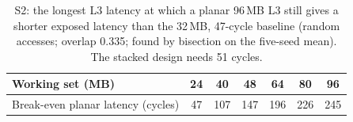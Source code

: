 \begin{table}[htbp]
  \centering
  \caption[S2: the slowest planar 96\,MB L3 that still beats the baseline]{S2: the longest L3 latency at which a planar 96\,MB L3 still gives a shorter exposed latency than the 32\,MB, 47-cycle baseline (random accesses; overlap 0.335; found by bisection on the five-seed mean). The stacked design needs 51 cycles.}
  \label{tab:sim-planar}
  \small
  \begin{tabular}{@{}lcccccc@{}}
    \toprule
    \textbf{Working set (MB)} & 24 & 40 & 48 & 64 & 80 & 96 \\
    \midrule
    Break-even planar latency (cycles) & 47 & 107 & 147 & 196 & 226 & 245 \\
    \bottomrule
  \end{tabular}
\end{table}
